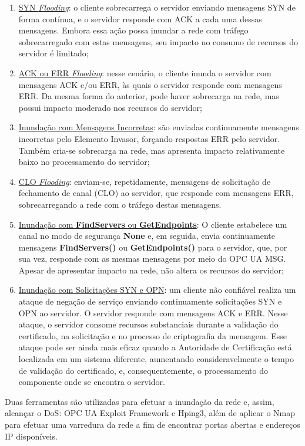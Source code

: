     \begin{enumerate}
        \item \underline{SYN \textit{Flooding}}: o cliente sobrecarrega o servidor enviando mensagens SYN de forma contínua, e o servidor responde com ACK a cada uma dessas mensagens. Embora essa ação possa inundar a rede com tráfego sobrecarregado com estas mensagens, seu impacto no consumo de recursos do servidor é limitado;
        \item \underline{ACK ou ERR \textit{Flooding}}: nesse cenário, o cliente inunda o servidor com mensagens ACK e/ou ERR, às quais o servidor responde com mensagens ERR. Da mesma forma do anterior, pode haver sobrecarga na rede, mas possui impacto moderado nos recursos do servidor;
        \item \underline{Inundação com Mensagens Incorretas}: são enviadas continuamente mensagens incorretas pelo Elemento Invasor, forçando respostas ERR pelo servidor. Também cria-se sobrecarga na rede, mas apresenta impacto relativamente baixo no processamento do servidor;
        \item \underline{CLO \textit{Flooding}}: enviam-se, repetidamente, mensagens de solicitação de fechamento de canal (CLO) ao servidor, que responde com mensagens ERR, sobrecarregando a rede com o tráfego destas mensagens.
        \item \underline{Inundação com \textbf{FindServers} ou \textbf{GetEndpoints}}: O cliente estabelece um canal no modo de segurança \textbf{None} e, em seguida, envia continuamente mensagens \textbf{FindServers()} ou \textbf{GetEndpoints()} para o servidor, que, por sua vez, responde com as mesmas mensagens por meio do OPC UA MSG. Apesar de apresentar impacto na rede, não altera os recursos do servidor;
        \item \underline{Inundação com Solicitações SYN e OPN}: um cliente não confiável realiza um ataque de negação de serviço enviando continuamente solicitações SYN e OPN ao servidor. O servidor responde com mensagens ACK e ERR. Nesse ataque, o servidor consome recursos substanciais durante a validação do certificado, na solicitação e no processo de criptografia da mensagem. Esse ataque pode ser ainda mais eficaz quando a Autoridade de Certificação está localizada em um sistema diferente, aumentando consideravelmente o tempo de validação do certificado, e, consequentemente, o processamento do componente onde se encontra o servidor.
    \end{enumerate}

    Duas ferramentas são utilizadas para efetuar a inundação da rede e, assim, alcançar o DoS: OPC UA Exploit Framework e Hping3, além de aplicar o Nmap para efetuar uma varredura da rede a fim de encontrar portas abertas e endereços IP disponíveis. 

